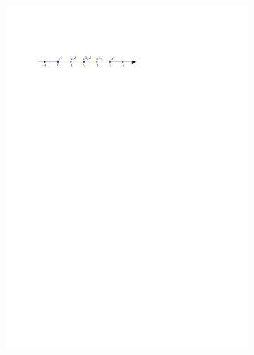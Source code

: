 \documentclass[12pt,final,3p]{elsarticle}
\begin{document}
\begin{figure}[h]
	\centering
	\begin{subfigure}{0.47\textwidth}
		\includegraphics[width=\textwidth, keepaspectratio]{figures/newtonpoly_1.pdf}
	\end{subfigure}


\end{figure}
\end{document}
